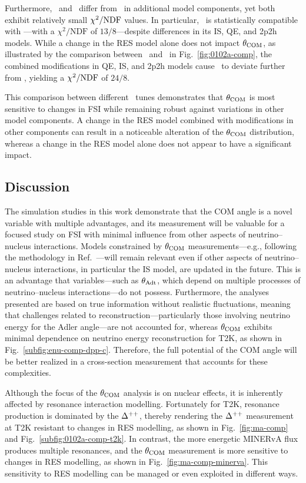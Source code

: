      Furthermore, \geoa\ and \getwoa\ differ from \gZero\ in additional model components, yet both exhibit relatively small $\chi^2/{\textrm{NDF}}$ values.
     In particular, \getwoa\ is statistically compatible with \gZero—with a $\chi^2/\textrm{NDF}$ of $13/8$—despite differences in its IS, QE, and 2p2h models.
     While a change in the RES model alone does not impact $\theta_{\textrm{COM}}$, as illustrated by the comparison between \geoa\ and \getwoa\ in Fig.~\ref{fig:0102a-comp}, the combined modifications in QE, IS, and 2p2h models cause \geoa\ to deviate further from \gZero, yielding a $\chi^2/{\textrm{NDF}}$ of $24/8$.

     This comparison between different \genie\ tunes demonstrates that $\theta_{\textrm{COM}}$ is most sensitive to changes in FSI while remaining robust against variations in other model components.
     A change in the RES model combined with modifications in other components can result in a noticeable alteration of the $\theta_{\textrm{COM}}$ distribution, whereas a change in the RES model alone does not appear to have a significant impact.


     \subsection{Discussion}
     \label{sec:dis}
     The simulation studies in this work demonstrate that the COM angle is a novel variable with multiple advantages, and its measurement will be valuable for a focused study on FSI with minimal influence from other aspects of neutrino–nucleus interactions.
     Models constrained by $\theta_{\textrm{COM}}$ measurements—e.g., following the methodology in Ref.~\cite{GENIE:2021zuu}—will remain relevant even if other aspects of neutrino–nucleus interactions, in particular the IS model, are updated in the future.
     This is an advantage that variables—such as $\theta_{\textrm{Adt}}$, which depend on multiple processes of neutrino–nucleus interactions—do not possess.
     Furthermore, the analyses presented are based on true information without realistic fluctuations, meaning that challenges related to reconstruction—particularly those involving neutrino energy for the Adler angle—are not accounted for, whereas $\theta_{\textrm{COM}}$ exhibits minimal dependence on neutrino energy reconstruction for T2K, as shown in Fig.~\ref{subfig:enu-comp-dpp-c}.
     Therefore, the full potential of the COM angle will be better realized in a cross-section measurement that accounts for these complexities.

     Although the focus of the $\theta_{\textrm{COM}}$ analysis is on nuclear effects, it is inherently affected by resonance interaction modelling.
     Fortunately for T2K, resonance production is dominated by the $\Delta^{++}$, thereby rendering the $\Delta^{++}$ measurement at T2K resistant to changes in RES modelling, as shown in Fig.~\ref{fig:ma-comp} and Fig.~\ref{subfig:0102a-comp-t2k}.
     In contrast, the more energetic MINERvA flux produces multiple resonances, and the $\theta_{\textrm{COM}}$ measurement is more sensitive to changes in RES modelling, as shown in Fig.~\ref{fig:ma-comp-minerva}.
     This sensitivity to RES modelling can be managed or even exploited in different ways.

